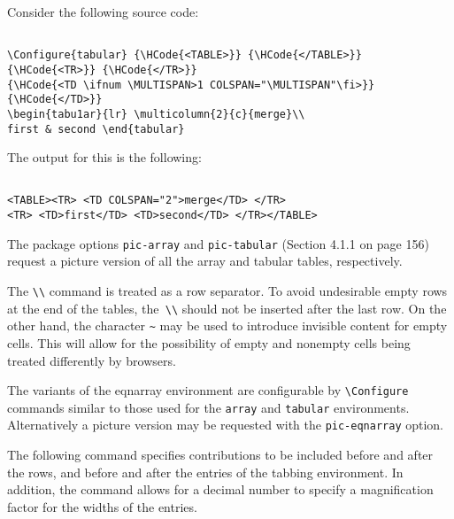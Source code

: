  
Consider the following source code: 

\begin{lstlisting}

\Configure{tabular} {\HCode{<TABLE>}} {\HCode{</TABLE>}} 
{\HCode{<TR>}} {\HCode{</TR>}} 
{\HCode{<TD \ifnum \MULTISPAN>1 COLSPAN="\MULTISPAN"\fi>}} 
{\HCode{</TD>}} 
\begin{tabu1ar}{lr} \multicolumn{2}{c}{merge}\\ 
first & second \end{tabular} 

\end{lstlisting}

The output for this is the following: 

\begin{lstlisting}

<TABLE><TR> <TD COLSPAN="2">merge</TD> </TR> 
<TR> <TD>first</TD> <TD>second</TD> </TR></TABLE> 

\end{lstlisting}

The package options \verb|pic-array| and \verb|pic-tabular| (Section
4.1.1 on page 156) request a picture version of all the array and
tabular tables, respectively. 

The \verb|\\| command is treated as a row separator. To avoid
undesirable empty rows at the end of the tables, the\verb| \\| should
not be inserted after the last row. On the other hand, the character
\verb|~| may be used to introduce invisible content for empty cells.
This will allow for the possibility of empty and nonempty cells being
treated differently by browsers. 


The variants of the eqnarray environment are configurable by \verb|\Configure|
commands similar to those used for the \verb|array| and \verb|tabular| environments.
Alternatively a picture version may be requested with the \verb|pic-eqnarray|
option. 


The following command specifies contributions to be included before and after the 
rows, and before and after the entries of the tabbing environment. In addition, 
the command allows for a decimal number to specify a magnification factor for the 
widths of the entries. 

